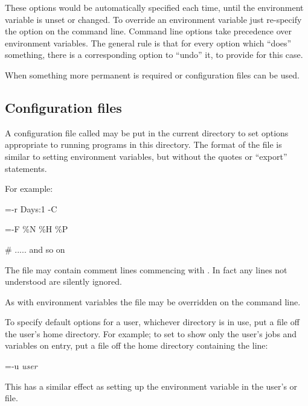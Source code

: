 These options would be automatically specified each time, until the environment variable is unset or changed. To override an environment
variable just re-specify the option on the command line. Command line options take precedence over environment variables. The general rule is
that for every option which ``does'' something, there is a corresponding option to ``undo'' it, to provide for this case.

When something more permanent is required \configurationfile{} or \homeconfigpath{} configuration files can be used.

\subsection{Configuration files}
A configuration file called \configurationfile{} may be put in the current directory to set options appropriate to running \ProductName{}
programs in this directory. The format of the file is similar to setting environment variables, but without the quotes or
``export'' statements.

For example:

\begin{expara}

\BtrVarname=-r Days:1 -C

\BtjlistVarname=-F {\textquotedbl}\%N \%H \%P{\textquotedbl}

\# ..... and so on

\end{expara}

The file may contain comment lines commencing with \exampletext{\#}. In fact any lines not understood are silently ignored.

As with environment variables the \configurationfile{} file may be overridden on the command line.

To specify default options for a user, whichever directory is in use, put a \homeconfigpath{} file off the user's
home directory. For example; to set \PrBtq{} to show only the user's jobs and variables on entry, put a \homeconfigpath{} file off the home directory containing the line:

\begin{expara}

\BtqVarname=-u \textit{user}

\end{expara}

This has a similar effect as setting up the environment variable \filename{\BtqVarname} in the user's  or  file.

